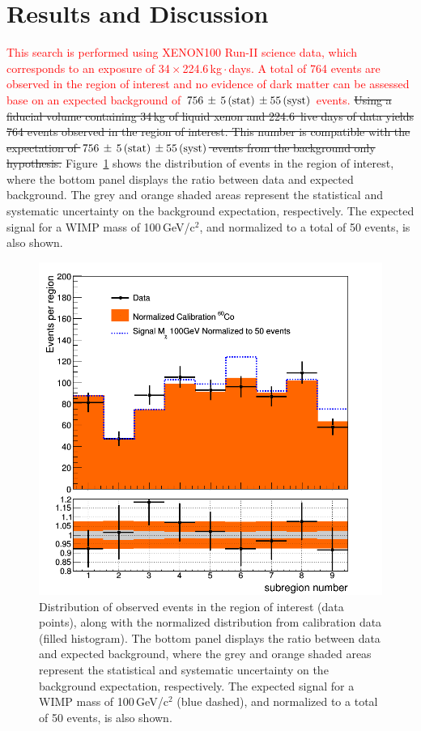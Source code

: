 \section{Results and Discussion}
\label{sec:results}

\textcolor{red} {This search is performed using XENON100 Run-II science data, which corresponds to an exposure of 34\,$\times$\,224.6\,kg\,$\cdot$\,days. 
A total of 764 events are observed in the region of interest and no evidence of dark matter can be assessed base on an expected background of
$756 \, \pm \, 5 \,{\rm (stat)} \, \pm 55\, {\rm (syst)}$ events. }
\sout{Using a fiducial volume containing 34\,kg of liquid xenon and 224.6~live days of data yields 764 events observed  in the region of interest.
This number is compatible with the expectation of $756 \, \pm \, 5 \,{\rm (stat)} \, \pm 55\, {\rm (syst)}$ events from the background only hypothesis.} 
Figure~\ref{fig:dataVSbkg} shows the distribution of  events  in the region of interest, where the bottom panel displays the ratio
between data and expected background. The grey and orange shaded areas represent the statistical and systematic uncertainty 
on the background expectation, respectively. The expected signal for a WIMP mass of 100\,GeV/c$^2$, and normalized to a total of 50 events, is also shown.


\begin{figure}[t!]
  \includegraphics[width=\linewidth]{images/data_vs_bkg.png}
  \caption{Distribution of  observed events  in the region of interest (data points), along with the normalized distribution from calibration data (filled histogram). The bottom panel displays the ratio
between data and expected background, where the grey and orange shaded areas represent the statistical and systematic uncertainty 
on the background expectation, respectively. The expected signal for a WIMP mass of 100\,GeV/c$^2$ (blue dashed), and normalized to a total of 50 events, is also shown.}
  \label{fig:dataVSbkg}
\end{figure}

